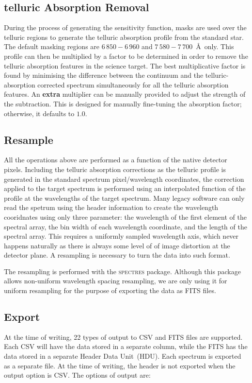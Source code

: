 \documentclass[linenumbers, twocolumn]{aastex631}
\begin{document}
\subsection{telluric Absorption Removal}
During the process of generating the sensitivity function, masks are used
over the telluric regions to generate the telluric absorption
profile from the standard star. The default masking regions are $6\,850-6\,960$
and $7\,580-7\,700$\ \AA\ only. This profile can then be multiplied
by a factor to be determined in order to remove the telluric absorption
features in the science target. The best multiplicative factor is found
by minimising the difference between the continuum and the telluric-absorption
corrected spectrum simultaneously for all the telluric absorption features.
An \textbf{extra} multiplier can be manually provided to adjust the
strength of the subtraction. This is designed for manually fine-tuning the
absorption factor; otherwise, it defaults to $1.0$.

\subsection{Resample}
All the operations above are performed as a function of the native detector
pixels. Including the telluric absorption corrections as the telluric profile
is generated in the standard spectrum pixel/wavelength coordinates, the
correction applied to the target spectrum is performed using an interpolated
function of the profile at the wavelengths of the target spectrum. Many legacy
software can only read the spetrum using the header information to create
the wavelength cooridnates using only three parameter: the wavelength of the
first element of the spectral array, the bin width of each wavelength
coordinate, and the length of the spectral array. This requires a uniformly
sampled wavelength axis, which never happens naturally as there is always some
level of of image distortion at the detector plane. A resampling is necessary
to turn the data into such format.

The resampling is performed with the \textsc{spectres} package. Although
this package allows non-uniform wavelength spacing resampling, we are only
using it for uniform resampling for the purpose of exporting the data as FITS
files.

\subsection{Export}
At the time of writing, 22 types of output to CSV and FITS files are supported.
Each CSV will have the data stored in a separate column, while the FITS has
the data stored in a separate Header Data Unit~(HDU). Each spectrum is exported
as a separate file. At the time of writing, the header is not exported when the
output option is CSV. The options of output are:
\end{document}
